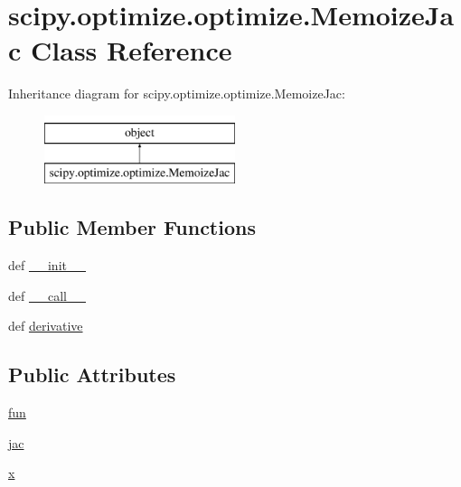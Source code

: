 \hypertarget{classscipy_1_1optimize_1_1optimize_1_1MemoizeJac}{}\section{scipy.\+optimize.\+optimize.\+Memoize\+Jac Class Reference}
\label{classscipy_1_1optimize_1_1optimize_1_1MemoizeJac}
Inheritance diagram for scipy.\+optimize.\+optimize.\+Memoize\+Jac\+:\begin{figure}[H]
\begin{center}
\leavevmode
\includegraphics[height=2.000000cm]{classscipy_1_1optimize_1_1optimize_1_1MemoizeJac}
\end{center}
\end{figure}
\subsection*{Public Member Functions}
\begin{DoxyCompactItemize}
\item 
def \hyperlink{classscipy_1_1optimize_1_1optimize_1_1MemoizeJac_a82df7851848860f386061c40261795c8}{\+\_\+\+\_\+init\+\_\+\+\_\+}
\item 
def \hyperlink{classscipy_1_1optimize_1_1optimize_1_1MemoizeJac_a8f8b729857668a88dfcdd6c6fd66201c}{\+\_\+\+\_\+call\+\_\+\+\_\+}
\item 
def \hyperlink{classscipy_1_1optimize_1_1optimize_1_1MemoizeJac_a0453b098fef68e9821c802608b63a1bc}{derivative}
\end{DoxyCompactItemize}
\subsection*{Public Attributes}
\begin{DoxyCompactItemize}
\item 
\hyperlink{classscipy_1_1optimize_1_1optimize_1_1MemoizeJac_a10ebedf1f2ab4364a47e7ee2472bbbe7}{fun}
\item 
\hyperlink{classscipy_1_1optimize_1_1optimize_1_1MemoizeJac_aa4fa5285b93c838842873a8166a945ae}{jac}
\item 
\hyperlink{classscipy_1_1optimize_1_1optimize_1_1MemoizeJac_a87c3c412579e897c04361c078dafc142}{x}
\end{DoxyCompactItemize}


